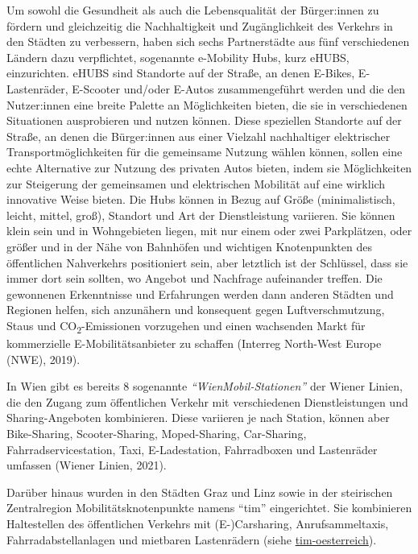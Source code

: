 \documentclass[
]{book}
\begin{document}
Um sowohl die Gesundheit als auch die Lebensqualität der Bürger:innen zu fördern und gleichzeitig die Nachhaltigkeit und Zugänglichkeit des Verkehrs in den Städten zu verbessern, haben sich sechs Partnerstädte aus fünf verschiedenen Ländern dazu verpflichtet, sogenannte e-Mobility Hubs, kurz eHUBS, einzurichten. eHUBS sind Standorte auf der Straße, an denen E-Bikes, E-Lastenräder, E-Scooter und/oder E-Autos zusammengeführt werden und die den Nutzer:innen eine breite Palette an Möglichkeiten bieten, die sie in verschiedenen Situationen ausprobieren und nutzen können. Diese speziellen Standorte auf der Straße, an denen die Bürger:innen aus einer Vielzahl nachhaltiger elektrischer Transportmöglichkeiten für die gemeinsame Nutzung wählen können, sollen eine echte Alternative zur Nutzung des privaten Autos bieten, indem sie Möglichkeiten zur Steigerung der gemeinsamen und elektrischen Mobilität auf eine wirklich innovative Weise bieten. Die Hubs können in Bezug auf Größe (minimalistisch, leicht, mittel, groß), Standort und Art der Dienstleistung variieren. Sie können klein sein und in Wohngebieten liegen, mit nur einem oder zwei Parkplätzen, oder größer und in der Nähe von Bahnhöfen und wichtigen Knotenpunkten des öffentlichen Nahverkehrs positioniert sein, aber letztlich ist der Schlüssel, dass sie immer dort sein sollten, wo Angebot und Nachfrage aufeinander treffen. Die gewonnenen Erkenntnisse und Erfahrungen werden dann anderen Städten und Regionen helfen, sich anzunähern und konsequent gegen Luftverschmutzung, Staus und CO\textsubscript{2}-Emissionen vorzugehen und einen wachsenden Markt für kommerzielle E-Mobilitätsanbieter zu schaffen (Interreg North-West Europe (NWE), 2019).

In Wien gibt es bereits 8 sogenannte \emph{``WienMobil-Stationen''} der Wiener Linien, die den Zugang zum öffentlichen Verkehr mit verschiedenen Dienstleistungen und Sharing-Angeboten kombinieren. Diese variieren je nach Station, können aber Bike-Sharing, Scooter-Sharing, Moped-Sharing, Car-Sharing, Fahrradservicestation, Taxi, E-Ladestation, Fahrradboxen und Lastenräder umfassen (Wiener Linien, 2021).

Darüber hinaus wurden in den Städten Graz und Linz sowie in der steirischen Zentralregion Mobilitätsknotenpunkte namens ``tim'' eingerichtet. Sie kombinieren Haltestellen des öffentlichen Verkehrs mit (E-)Carsharing, Anrufsammeltaxis, Fahrradabstellanlagen und mietbaren Lastenrädern (siehe \href{https://www.tim-oesterreich.at}{tim-oesterreich}).
\end{document}
